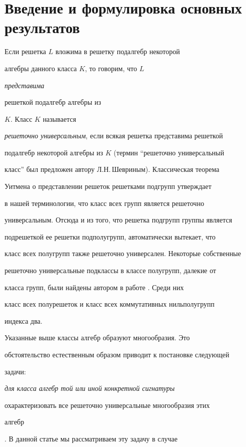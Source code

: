 \maketitle





\section{Введение и формулировка основных результатов}





Если решетка $L$ вложима в решетку подалгебр некоторой


алгебры данного класса $K$, то говорим, что $L$ {\em представима


решеткой подалгебр алгебры из} $K$. Класс $K$ называется


{\em решеточно универсальным}, если всякая решетка представима решеткой


подалгебр некоторой алгебры из $K$ (термин ``решеточно универсальный


класс'' был предложен автору Л.Н.\,Шевриным). Классическая теорема


Уитмена \cite{Whit} о представлении решеток решетками подгрупп утверждает


в нашей терминологии, что класс всех групп является решеточно


универсальным. Отсюда и из того, что решетка подгрупп группы является


подрешеткой ее решетки подполугрупп, автоматически вытекает, что


класс всех полугрупп также решеточно универсален. Некоторые собственные


решеточно универсальные подклассы в классе полугрупп, далекие от


класса групп, были найдены автором в работе \cite{Rep1}. Среди них


класс всех полурешеток и класс всех коммутативных нильполугрупп


индекса два.





Указанные выше классы алгебр образуют многообразия. Это


обстоятельство естественным образом приводит к постановке следующей


задачи: {\em для класса алгебр той или иной конкретной сигнатуры


охарактеризовать все решеточно универсальные многообразия этих


алгебр}. В данной статье мы рассматриваем эту задачу в случае


